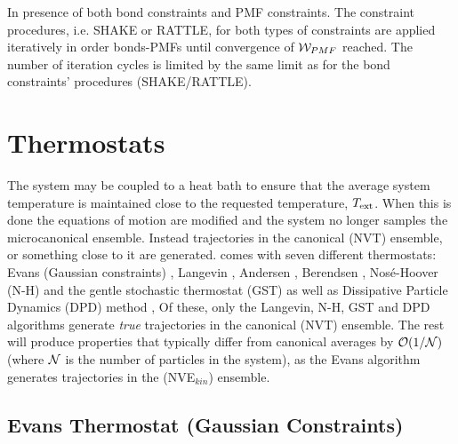 In presence of both bond constraints and
PMF constraints.  The constraint procedures,
i.e. SHAKE or RATTLE, for both types of constraints are applied
iteratively in order bonds-PMFs until convergence of ${\cal W}_{PMF}$
reached.  The number of iteration cycles is limited by the same limit
as for the bond constraints' procedures (SHAKE/RATTLE).

\section{Thermostats}

The system may be coupled to a heat bath to ensure that the average
system temperature is maintained close to the requested temperature,
$T_{\rm ext}$.  When this is done the equations of motion are
modified and the system no longer samples the microcanonical
ensemble.  Instead trajectories in the canonical
(NVT) ensemble, or something close to it
are generated.  \D comes with seven different thermostats: Evans
(Gaussian constraints) \cite{evans-84a},
Langevin \cite{adelman-76a,izaguirre-01a}, Andersen \cite{andersen-79a},
Berendsen \cite{berendsen-84a}, Nos\'e-Hoover (N-H) \cite{hoover-85a} and
the gentle stochastic thermostat (GST) \cite{leimkuhler-09a,samoletov-07a}
as well as Dissipative Particle Dynamics (DPD) method 
\cite{hoogerbrugge-92a,espanol-95a,groot-97a,shardlow-03a},  Of these,
only the Langevin, N-H, GST and DPD algorithms generate \emph{true}
trajectories in the canonical (NVT) ensemble.  The rest will produce
properties that typically differ from canonical averages by ${\cal O}(1/{\cal N})$
\cite{allen-89a} (where $\cal N$ is the number of particles in the system),
as the Evans algorithm generates trajectories in the (NVE$_{kin}$) ensemble.

\subsection{Evans Thermostat (Gaussian Constraints)}

